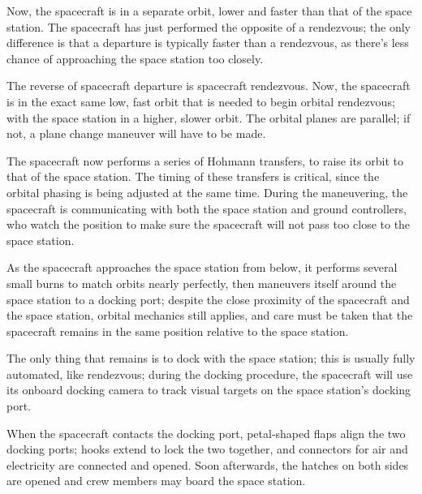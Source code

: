 Now, the spacecraft is in a separate orbit, lower and faster than that
of the space station. The spacecraft has just performed the opposite
of a rendezvous; the only difference is that a departure is typically
faster than a rendezvous, as there's less chance of approaching the
space station too closely.

The reverse of spacecraft departure is spacecraft rendezvous. Now, the
spacecraft is in the exact same low, fast orbit that is needed to
begin orbital rendezvous; with the space station in a higher, slower
orbit. The orbital planes are parallel; if not, a plane change
maneuver will have to be made.

The spacecraft now performs a series of Hohmann transfers, to raise
its orbit to that of the space station. The timing of these transfers
is critical, since the orbital phasing is being adjusted at the same
time. During the maneuvering, the spacecraft is communicating with
both the space station and ground controllers, who watch the position
to make sure the spacecraft will not pass too close to the space
station.

As the spacecraft approaches the space station from below, it performs
several small burns to match orbits nearly perfectly, then maneuvers
itself around the space station to a docking port; despite the close
proximity of the spacecraft and the space station, orbital mechanics
still applies, and care must be taken that the spacecraft remains in
the same position relative to the space station.

The only thing that remains is to dock with the space station; this is
usually fully automated, like rendezvous; during the docking
procedure, the spacecraft will use its onboard docking camera to track
visual targets on the space station's docking port.

When the spacecraft contacts the docking port, petal-shaped flaps
align the two docking ports; hooks extend to lock the two together,
and connectors for air and electricity are connected and opened. Soon
afterwards, the hatches on both sides are opened and crew members may
board the space station.

